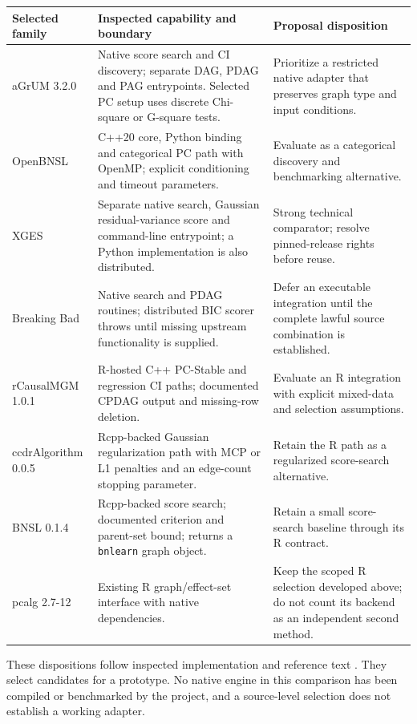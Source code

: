 \begin{longtable}{@{}P{.18\linewidth}P{.39\linewidth}P{.35\linewidth}@{}}
\toprule
Selected family & Inspected capability and boundary & Proposal disposition\\
\midrule
\endhead
aGrUM 3.2.0 & Native score search and CI discovery; separate DAG, PDAG and PAG
entrypoints. Selected PC setup uses discrete Chi-square or G-square tests. &
Prioritize a restricted native adapter that preserves graph type and input
conditions.\\
OpenBNSL & C++20 core, Python binding and categorical PC path with OpenMP;
explicit conditioning and timeout parameters. & Evaluate as a categorical
discovery and benchmarking alternative.\\
XGES & Separate native search, Gaussian residual-variance score and command-line
entrypoint; a Python implementation is also distributed. & Strong technical
comparator; resolve pinned-release rights before reuse.\\
Breaking Bad & Native search and PDAG routines; distributed BIC scorer throws
until missing upstream functionality is supplied. & Defer an executable
integration until the complete lawful source combination is established.\\
rCausalMGM 1.0.1 & R-hosted C++ PC-Stable and regression CI paths; documented
CPDAG output and missing-row deletion. & Evaluate an R integration with
explicit mixed-data and selection assumptions.\\
ccdrAlgorithm 0.0.5 & Rcpp-backed Gaussian regularization path with MCP or L1
penalties and an edge-count stopping parameter. & Retain the R path as a
regularized score-search alternative.\\
BNSL 0.1.4 & Rcpp-backed score search; documented criterion and parent-set
bound; returns a \texttt{bnlearn} graph object. & Retain a small score-search
baseline through its R contract.\\
pcalg 2.7-12 & Existing R graph/effect-set interface with native dependencies. &
Keep the scoped R selection developed above; do not count its backend as an
independent second method.\\
\bottomrule
\end{longtable}

These dispositions follow inspected implementation and reference text
\citep{exec13_cxx_agrum,exec13_cxx_openbnsl,exec13_cxx_xges,
exec13_cxx_breaking,exec13_cxx_rcausalmgm,exec13_cxx_ccdr,
exec13_cxx_bnsl,exec13_pcalg_reuse_primary}.
They select candidates for a prototype. No native engine in this comparison
has been compiled or benchmarked by the project, and a source-level selection
does not establish a working adapter.


